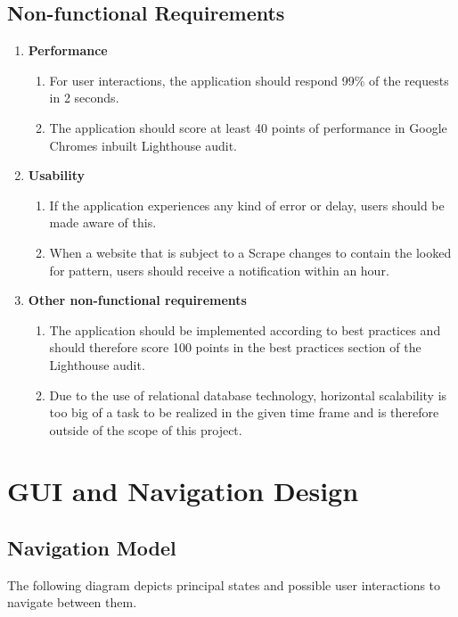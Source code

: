 \documentclass[titlepage, 12pt]{article}
\begin{document}
\subsection{Non-functional Requirements}

\begin{enumerate}
  \item \textbf{Performance}
        \begin{enumerate}
          \item For user interactions, the application should respond 99\% of the requests in 2 seconds.
          \item The application should score at least 40 points of performance in Google Chromes inbuilt Lighthouse audit.
        \end{enumerate}
  \item \textbf{Usability}
        \begin{enumerate}
          \item If the application experiences any kind of error or delay, users should be made aware of this.
          \item When a website that is subject to a Scrape changes to contain the looked for pattern, users should receive a notification within an hour.
        \end{enumerate}
  \item \textbf{Other non-functional requirements}
        \begin{enumerate}
          \item The application should be implemented according to best practices and should therefore score 100 points in the best practices section of the Lighthouse audit.
          \item Due to the use of relational database technology, horizontal scalability is too big of a task to be realized in the given time frame and is therefore outside of the scope of this project.
        \end{enumerate}
\end{enumerate}

\section{GUI and Navigation Design}
\subsection{Navigation Model}

The following diagram depicts principal states and possible user interactions to navigate between them.
\end{document}
